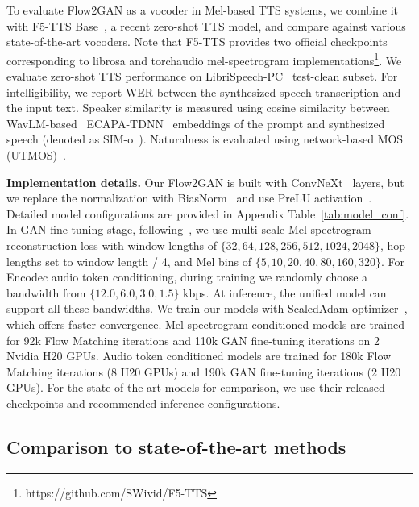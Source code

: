 \documentclass{article} %
\begin{document}
To evaluate Flow2GAN as a vocoder in Mel-based TTS systems, we combine it with F5-TTS Base~\citep{f5}, a recent zero-shot TTS model, and compare against various state-of-the-art vocoders. Note that F5-TTS provides two official checkpoints corresponding to librosa and torchaudio mel-spectrogram implementations\footnote{https://github.com/SWivid/F5-TTS}. 
We evaluate zero-shot TTS performance on LibriSpeech-PC~\citep{librispeech-pc} test-clean subset. 
For intelligibility, we report WER between the synthesized speech transcription and the input text. Speaker similarity is measured using cosine similarity between WavLM-based~\citep{wavlm} ECAPA-TDNN~\citep{ecapa} embeddings of the prompt and synthesized speech (denoted as SIM-o~\citep{voicebox}). Naturalness is evaluated using network-based MOS (UTMOS)~\citep{utmos}. 

\noindent\textbf{Implementation details.}
Our Flow2GAN is built with ConvNeXt~\citep{convnext} layers, but we replace the normalization with BiasNorm~\citep{zipformer} and use PreLU activation~\citep{prelu}.
Detailed model configurations are provided in Appendix Table~\ref{tab:model_conf}. 
In GAN fine-tuning stage, following~\citep{dac}, we use multi-scale Mel-spectrogram reconstruction loss with window lengths of $\{32, 64, 128, 256, 512, 1024, 2048\}$, hop lengths set to window length / 4, and Mel bins of $\{5, 10, 20, 40, 80, 160, 320\}$.
For Encodec audio token conditioning, during training we randomly choose a bandwidth from $\{12.0, 6.0, 3.0, 1.5\}$ kbps. At inference, the unified model can support all these bandwidths. We train our models with ScaledAdam optimizer~\citep{zipformer}, which offers faster convergence. Mel-spectrogram conditioned models are trained for 92k Flow Matching iterations and 110k GAN fine-tuning iterations on 2 Nvidia H20 GPUs. Audio token conditioned models are trained for 180k Flow Matching iterations (8 H20 GPUs) and 190k GAN fine-tuning iterations (2 H20 GPUs). For the state-of-the-art models for comparison, we use their released checkpoints and recommended inference configurations.

\vspace{-1em}
\subsection{Comparison to state-of-the-art methods}
\label{ssec:comp_sota}
\end{document}

